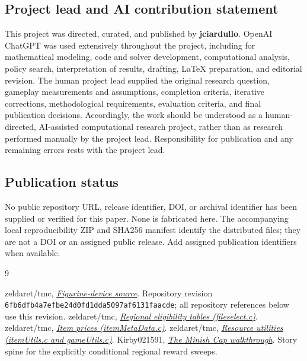 \documentclass[11pt]{article}
\theoremstyle{definition}\newtheorem{definition}[theorem]{Definition}
\begin{document}
\subsection*{Project lead and AI contribution statement}
This project was directed, curated, and published by \textbf{jciardullo}. OpenAI ChatGPT was used extensively throughout the project, including for mathematical modeling, code and solver development, computational analysis, policy search, interpretation of results, drafting, LaTeX preparation, and editorial revision.
The human project lead supplied the original research question, gameplay measurements and assumptions, completion criteria, iterative corrections, methodological requirements, evaluation criteria, and final publication decisions.
Accordingly, the work should be understood as a human-directed, AI-assisted computational research project, rather than as research performed manually by the project lead. Responsibility for publication and any remaining errors rests with the project lead.

\subsection*{Publication status}
No public repository URL, release identifier, DOI, or archival identifier has been supplied or verified for this paper. None is fabricated here. The accompanying local reproducibility ZIP and SHA256 manifest identify the distributed files; they are not a DOI or an assigned public release. Add assigned publication identifiers when available.

\clearpage
\begin{thebibliography}{9}
\raggedright
{} zeldaret/tmc, \href{https://github.com/zeldaret/tmc/blob/6fb6dfb4a7efbe24d0fd1dda5097af6131faacde/src/object/figurineDevice.c}{\emph{Figurine-device source}}. Repository revision \texttt{6fb6dfb4a7efbe24d0fd1}\allowbreak\texttt{dda5097af6131faacde}; all repository references below use this revision.
 zeldaret/tmc, \href{https://github.com/zeldaret/tmc/blob/6fb6dfb4a7efbe24d0fd1dda5097af6131faacde/src/fileselect.c}{\emph{Regional eligibility tables (fileselect.c)}}.
 zeldaret/tmc, \href{https://github.com/zeldaret/tmc/blob/6fb6dfb4a7efbe24d0fd1dda5097af6131faacde/src/itemMetaData.c}{\emph{Item prices (itemMetaData.c)}}.
 zeldaret/tmc, \href{https://github.com/zeldaret/tmc/tree/6fb6dfb4a7efbe24d0fd1dda5097af6131faacde/src}{\emph{Resource utilities (itemUtils.c and gameUtils.c)}}.
 Kirby021591, \href{https://gamefaqs.gamespot.com/gba/920670-the-legend-of-zelda-the-minish-cap/faqs/34833}{\emph{The Minish Cap walkthrough}}. Story spine for the explicitly conditional regional reward sweeps.
\end{thebibliography}
\end{document}
